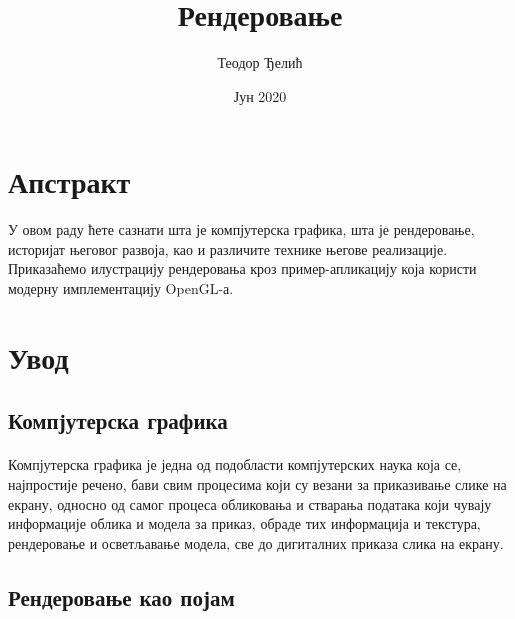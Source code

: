 \documentclass[12pt]{article}
\title{Рендеровање}
\author{Теодор Ђелић}
\date{Јун 2020}
\begin{document}
	
	\maketitle
	
	\section*{Апстракт}
	У овом раду ћете сазнати шта је компјутерска графика, шта је рендеровање, историјат његовог развоја, као и различите технике његове реализације. Приказаћемо илустрацију рендеровања кроз пример-апликацију која користи модерну имплементацију OpenGL-а.
	
	\section{Увод}
	
	\subsection{Компјутерска графика}
	\paragraph{}
	Компјутерска графика је једна од подобласти компјутерских наука која се, најпростије речено, бави свим процесима који су везани за приказивање слике на екрану, односно од самог процеса обликовања и стварања података који чувају информације облика и модела за приказ, обраде тих информација и текстура, рендеровање и осветљавање модела, све до дигиталних приказа слика на екрану.
	\subsection{Рендеровање као појам}
\end{document}
